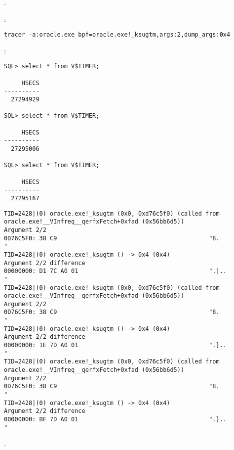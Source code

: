.

:

\begin{lstlisting}
tracer -a:oracle.exe bpf=oracle.exe!_ksugtm,args:2,dump_args:0x4
\end{lstlisting}

:

\begin{lstlisting}
SQL> select * from V$TIMER;

     HSECS
----------
  27294929

SQL> select * from V$TIMER;

     HSECS
----------
  27295006

SQL> select * from V$TIMER;

     HSECS
----------
  27295167
\end{lstlisting}

\begin{lstlisting}[caption=\RU{вывод \tracer}\EN{\tracer output}]
TID=2428|(0) oracle.exe!_ksugtm (0x0, 0xd76c5f0) (called from oracle.exe!__VInfreq__qerfxFetch+0xfad (0x56bb6d5))
Argument 2/2
0D76C5F0: 38 C9                                           "8.              "
TID=2428|(0) oracle.exe!_ksugtm () -> 0x4 (0x4)
Argument 2/2 difference
00000000: D1 7C A0 01                                     ".|..            "
TID=2428|(0) oracle.exe!_ksugtm (0x0, 0xd76c5f0) (called from oracle.exe!__VInfreq__qerfxFetch+0xfad (0x56bb6d5))
Argument 2/2
0D76C5F0: 38 C9                                           "8.              "
TID=2428|(0) oracle.exe!_ksugtm () -> 0x4 (0x4)
Argument 2/2 difference
00000000: 1E 7D A0 01                                     ".}..            "
TID=2428|(0) oracle.exe!_ksugtm (0x0, 0xd76c5f0) (called from oracle.exe!__VInfreq__qerfxFetch+0xfad (0x56bb6d5))
Argument 2/2
0D76C5F0: 38 C9                                           "8.              "
TID=2428|(0) oracle.exe!_ksugtm () -> 0x4 (0x4)
Argument 2/2 difference
00000000: BF 7D A0 01                                     ".}..            "
\end{lstlisting}

.

